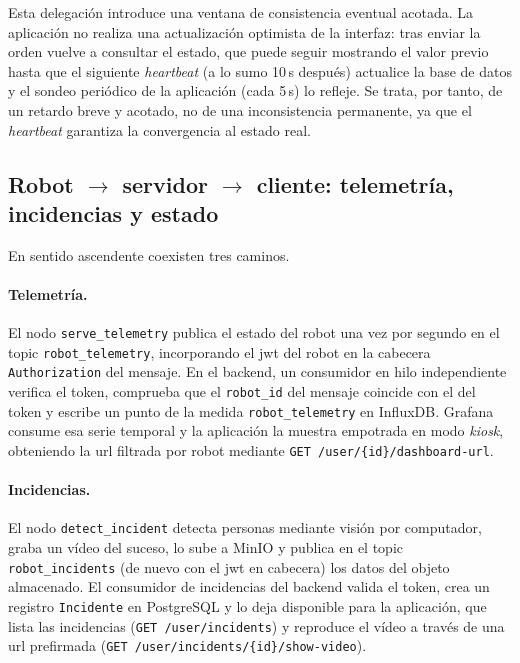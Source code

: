 Esta delegación introduce una ventana de consistencia eventual acotada. La
aplicación no realiza una actualización optimista de la interfaz: tras enviar la
orden vuelve a consultar el estado, que puede seguir mostrando el valor previo
hasta que el siguiente \textit{heartbeat} (a lo sumo 10\,s después) actualice la
base de datos y el sondeo periódico de la aplicación (cada 5\,s) lo refleje. Se
trata, por tanto, de un retardo breve y acotado, no de una inconsistencia
permanente, ya que el \textit{heartbeat} garantiza la convergencia al estado real.

\subsection{Robot \texorpdfstring{$\rightarrow$}{->} servidor
  \texorpdfstring{$\rightarrow$}{->} cliente: telemetría, incidencias y estado}
\label{sec:flujo-telemetria}

En sentido ascendente coexisten tres caminos.

\paragraph*{Telemetría.} El nodo \texttt{serve\_telemetry} publica el estado del
robot una vez por segundo en el topic \texttt{robot\_telemetry}, incorporando el
\gls{jwt} del robot en la cabecera \texttt{Authorization} del mensaje. En el
backend, un consumidor en hilo independiente verifica el token, comprueba que el
\texttt{robot\_id} del mensaje coincide con el del token y escribe un punto de la
medida \texttt{robot\_telemetry} en InfluxDB. Grafana consume esa serie temporal y
la aplicación la muestra empotrada en modo \textit{kiosk}, obteniendo la
\acrshort{url} filtrada por robot mediante \texttt{GET /user/\{id\}/dashboard-url}.

\paragraph*{Incidencias.} El nodo \texttt{detect\_incident} detecta personas
mediante visión por computador, graba un vídeo del suceso, lo sube a MinIO y
publica en el topic \texttt{robot\_incidents} (de nuevo con el \gls{jwt} en
cabecera) los datos del objeto almacenado. El consumidor de incidencias del
backend valida el token, crea un registro \texttt{Incidente} en PostgreSQL y lo
deja disponible para la aplicación, que lista las incidencias
(\texttt{GET /user/incidents}) y reproduce el vídeo a través de una \acrshort{url}
prefirmada (\texttt{GET /user/incidents/\{id\}/show-video}).

